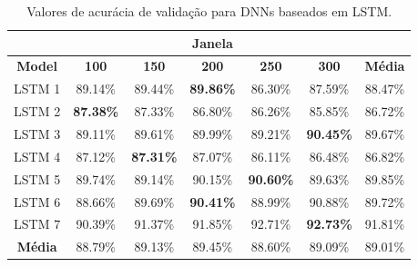 \begin{table}[h!]
\caption{Valores de acurácia de validação para DNNs baseados em LSTM.} 
\label{table:lstm_results}
\centering
\small
\begin{tabular}{ccccccc}
\cmidrule(lr){2-6}
 & \multicolumn{5}{c}{\textbf{Janela}} & \multicolumn{1}{c}{} \\ \midrule
\textbf{Model} & \multicolumn{1}{c}{\textbf{100}} & \multicolumn{1}{c}{\textbf{150}} & \multicolumn{1}{c}{\textbf{200}} & \multicolumn{1}{c}{\textbf{250}} & \multicolumn{1}{c}{\textbf{300}} & \multicolumn{1}{c}{\textbf{Média}} \\ \midrule
LSTM 1 & 89.14\% & 89.44\% & \textbf{89.86\%} & 86.30\% & 87.59\% & 88.47\% \\ \midrule
LSTM 2 & \textbf{87.38\%} & 87.33\% & 86.80\% & 86.26\% & 85.85\% & 86.72\% \\ \midrule
LSTM 3 & 89.11\% & 89.61\% & 89.99\% & 89.21\% & \textbf{90.45\%} & 89.67\% \\ \midrule
LSTM 4 & 87.12\% & \textbf{87.31\%} & 87.07\% & 86.11\% & 86.48\% & 86.82\% \\ \midrule
LSTM 5 & 89.74\% & 89.14\% & 90.15\% & \textbf{90.60\%} & 89.63\% & 89.85\% \\ \midrule
LSTM 6 & 88.66\% & 89.69\% & \textbf{90.41\%} & 88.99\% & 90.88\% & 89.72\% \\ \midrule
LSTM 7 & 90.39\% & 91.37\% & 91.85\% & 92.71\% & \textbf{92.73\%} & 91.81\% \\ \midrule
\textbf{Média} & 88.79\% & 89.13\% & 89.45\% & 88.60\% & 89.09\% & 89.01\% \\ \bottomrule
\end{tabular}
\end{table}


